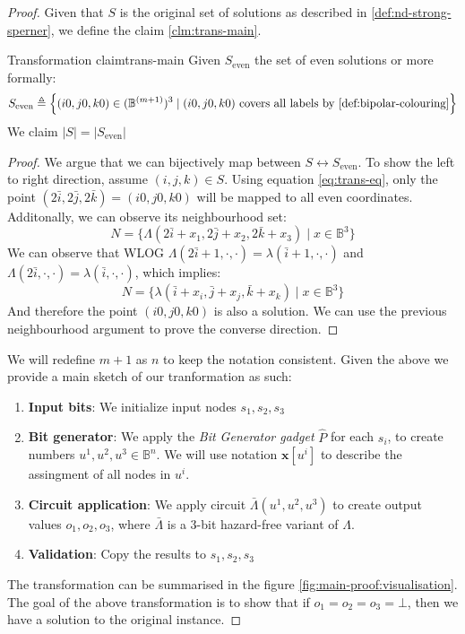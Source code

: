 \begin{proof}
Given that $S$ is the original set of solutions as described in \ref{def:nd-strong-sperner}, we define the claim \ref{clm:trans-main}.

\begin{claimbox}{Transformation claim}{trans-main}
    \label{clm:main-proof:trans-claim}
    Given $S_{\text{even}}$ the set of even solutions or more formally:
    $$
        S_{\text{even}} \triangleq
        \Big\{(i0,j0,k0) \in (\mathbb{B}^{(m+1)})^3 \mid (i0,j0,k0) \text{ covers all labels by \ref{def:bipolar-colouring}} \Big\}
    $$
    We claim $|S| = |S_{\text{even}}|$
\end{claimbox}

\begin{proof}
    We argue that we can bijectively map between $S \leftrightarrow S_{\text{even}}$.
    To show the left to right direction, assume $(i,j,k) \in S$.
    Using equation \ref{eq:trans-eq}, only the point $(2\bar{i}, 2\bar{j}, 2\bar{k}) = (i0, j0,k0)$ will be mapped to all even coordinates.
    Additonally, we can observe its neighbourhood set:
    $$
    N = \Big\{\Lambda(2\bar{i} + x_1, 2\bar{j} + x_2, 2\bar{k} + x_3) \mid x \in \mathbb{B}^3 \Big\}
    $$
    We can observe that WLOG $\Lambda(2\bar{i} + 1, \cdot, \cdot) = \lambda(\bar{i} + 1, \cdot, \cdot)$ and
    $\Lambda(2\bar{i}, \cdot, \cdot) = \lambda(\bar{i}, \cdot, \cdot)$, which implies:
    $$
    N = \Big\{\lambda(\bar{i} + x_i, \bar{j} + x_j, \bar{k} + x_k) \mid x \in \mathbb{B}^3 \Big\}
    $$
    And therefore the point $(i0, j0,k0)$ is also a solution. We can use the previous neighbourhood argument to prove the converse direction.
\end{proof}
We will redefine $m + 1$ as $n$ to keep the notation consistent.
Given the above we provide a main sketch of our tranformation as such:
\begin{enumerate}
    \item \textbf{Input bits}: We initialize input nodes $s_1, s_2, s_3$
    \item \textbf{Bit generator}: We apply the \textit{Bit Generator gadget} $\hat{P}$ for each $s_i$,
        to create numbers $u^1, u^2, u^3 \in \mathbb{B}^{n}$.  We will use notation $\mathbf{x}[u^i]$ to
        describe the assingment of all nodes in $u^i$.
    \item \textbf{Circuit application}: We apply circuit $\bar{\Lambda}(u^1, u^2, u^3)$ to create output values $o_1, o_2, o_3$, where 
$\bar{\Lambda}$ is a 3-bit hazard-free variant of $\Lambda$.
    \item \textbf{Validation}: Copy the results to $s_1, s_2, s_3$
\end{enumerate}
The transformation can be summarised in the figure \ref{fig:main-proof:visualisation}.
The goal of the above transformation is to show that if $o_1 = o_2 =o_3 = \bot$, then we have a solution
to the original instance.


\end{proof}
